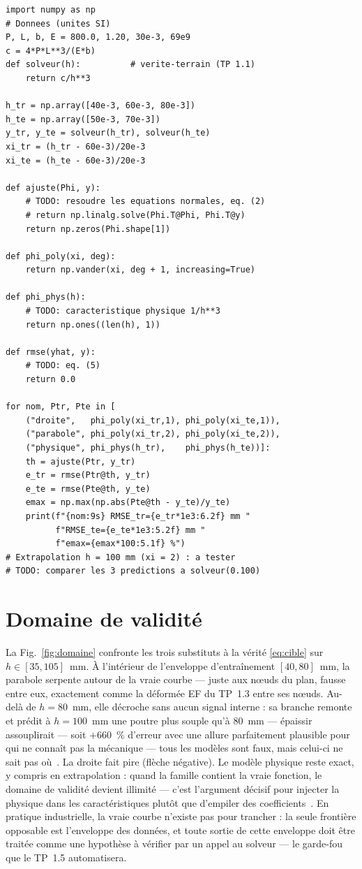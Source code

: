 \documentclass[10pt,journal]{IEEEtran}
\begin{document}
\begin{lstlisting}[caption={Chaine complete : echantillonnage, moindres carres, evaluation honnete. Completer les TODO puis comparer au Tableau~\ref{tab:res}.},label={lst:py},float=!t]
import numpy as np
# Donnees (unites SI)
P, L, b, E = 800.0, 1.20, 30e-3, 69e9
c = 4*P*L**3/(E*b)
def solveur(h):          # verite-terrain (TP 1.1)
    return c/h**3

h_tr = np.array([40e-3, 60e-3, 80e-3])
h_te = np.array([50e-3, 70e-3])
y_tr, y_te = solveur(h_tr), solveur(h_te)
xi_tr = (h_tr - 60e-3)/20e-3
xi_te = (h_te - 60e-3)/20e-3

def ajuste(Phi, y):
    # TODO: resoudre les equations normales, eq. (2)
    # return np.linalg.solve(Phi.T@Phi, Phi.T@y)
    return np.zeros(Phi.shape[1])

def phi_poly(xi, deg):
    return np.vander(xi, deg + 1, increasing=True)

def phi_phys(h):
    # TODO: caracteristique physique 1/h**3
    return np.ones((len(h), 1))

def rmse(yhat, y):
    # TODO: eq. (5)
    return 0.0

for nom, Ptr, Pte in [
    ("droite",   phi_poly(xi_tr,1), phi_poly(xi_te,1)),
    ("parabole", phi_poly(xi_tr,2), phi_poly(xi_te,2)),
    ("physique", phi_phys(h_tr),    phi_phys(h_te))]:
    th = ajuste(Ptr, y_tr)
    e_tr = rmse(Ptr@th, y_tr)
    e_te = rmse(Pte@th, y_te)
    emax = np.max(np.abs(Pte@th - y_te)/y_te)
    print(f"{nom:9s} RMSE_tr={e_tr*1e3:6.2f} mm "
          f"RMSE_te={e_te*1e3:5.2f} mm "
          f"emax={emax*100:5.1f} %")
# Extrapolation h = 100 mm (xi = 2) : a tester
# TODO: comparer les 3 predictions a solveur(0.100)
\end{lstlisting}

\section{Domaine de validité}
La Fig.~\ref{fig:domaine} confronte les trois substituts à la vérité \eqref{eq:cible} sur $h\in[35,105]$~mm. À l'intérieur de l'enveloppe d'entraînement $[40,80]$~mm, la parabole serpente autour de la vraie courbe --- juste aux n\oe{}uds du plan, fausse entre eux, exactement comme la déformée EF du TP~1.3 entre ses n\oe{}uds. Au-delà de $h=80$~mm, elle décroche sans aucun signal interne : sa branche remonte et prédit à $h=100$~mm une poutre plus souple qu'à 80~mm --- épaissir assouplirait --- soit $+660$~\% d'erreur avec une allure parfaitement plausible pour qui ne connaît pas la mécanique --- tous les modèles sont faux, mais celui-ci ne sait pas où~\cite{box}. La droite fait pire (flèche négative). Le modèle physique reste exact, y compris en extrapolation : quand la famille contient la vraie fonction, le domaine de validité devient illimité --- c'est l'argument décisif pour injecter la physique dans les caractéristiques plutôt que d'empiler des coefficients~\cite{forrester}. En pratique industrielle, la vraie courbe n'existe pas pour trancher : la seule frontière opposable est l'enveloppe des données, et toute sortie de cette enveloppe doit être traitée comme une hypothèse à vérifier par un appel au solveur --- le garde-fou que le TP~1.5 automatisera.
\end{document}
